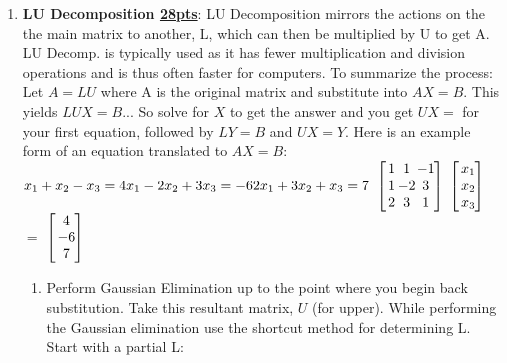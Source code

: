 \documentclass[fontsize=5pt]{scrartcl}
\makeatletter
\newenvironment{tmatrix3}%
{ 
  $\left[\hspace{-3.5pt}\begin{array}{c@{\hspace{1pt}}@{\hspace{1pt}}c@{\hspace{1pt}}c@{\hspace{3pt}}}
}%
{
   \end{array}\hspace{-3.5pt}\right]$
}
\newenvironment{tmatrix1}%
{ 
  $\left[\hspace{-3.5pt}\begin{array}{c@{\hspace{3pt}}}
}%
{
   \end{array}\hspace{-3.5pt}\right]$
}
\makeatother
\begin{document}
\begin{multicols}{3}
\begin{enumerate}
      \item \textbf{LU Decomposition \underline{28pts}}: LU Decomposition mirrors the actions on the the main matrix
          to another, L, which can then be multiplied by U to get A. LU Decomp. is typically used as it has fewer multiplication 
          and division operations and is thus often faster for computers.
          To summarize the process: Let $A=LU$ where A is the original matrix and substitute into $AX=B$. 
              This yields $LUX=B$... So solve for $X$ to get the answer
             and you get $UX= $ for your first equation, followed by $LY=B$ and $UX=Y$. Here is an example form of an equation translated to $AX=B$: \\
               $x_1+x_2-x_3=4 \\
               x_1-2x_2+3x_3=-6 \\
               2x_1+3x_2+x_3=7 \\$
              \begin{tmatrix3}
                1 & 1  & -1 \\
                1 & -2 & 3  \\
                2 & 3  & 1 
              \end{tmatrix3} %
              \begin{tmatrix1}
                x_1\\
                x_2\\
                x_3
              \end{tmatrix1} $=$%
              \begin{tmatrix1}
                 4 \\
                 -6 \\
                 7 \\
              \end{tmatrix1}

          \begin{enumerate}
            \thickmuskip=0mu
            \item Perform Gaussian Elimination up to the point where you begin back substitution. Take this resultant matrix,
            $U$ (for upper). While performing the Gaussian elimination use the shortcut method for determining L. Start with a partial
            L: \\
            

\end{enumerate}
\end{enumerate}
\end{multicols}
\end{document}
